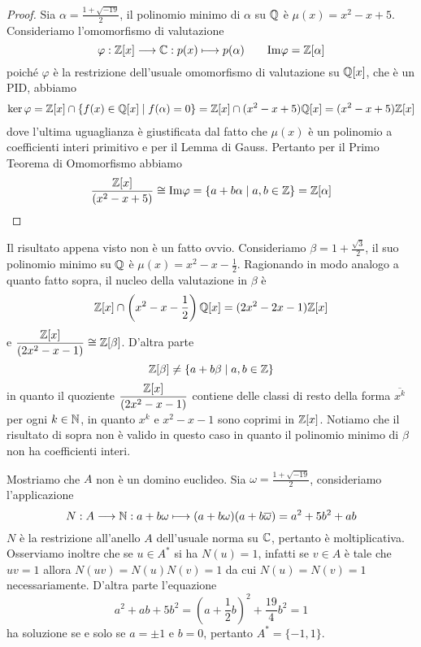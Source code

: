 \documentclass[11pt]{scrartcl}
\begin{document}
\begin{proof}
    Sia $\alpha = \displaystyle\frac{1 + \sqrt{-19}}{2}$, il polinomio minimo di $\alpha$
    su $\mathbb Q$ è $\mu(x) = x^2 - x + 5$. Consideriamo l'omomorfismo di valutazione
    \[
        \varphi: \mathbb Z[x]\longrightarrow \mathbb C: p(x) \longmapsto p(\alpha) 
        \qquad \mathrm{Im\varphi} = \mathbb Z[\alpha]
    \]
    poiché $\varphi$ è la restrizione dell'usuale omomorfismo di valutazione
    su $\mathbb Q[x]$, che è un PID, abbiamo
    \begin{multline*}
        \ker \varphi = \mathbb Z[x] \cap \{f(x) \in \mathbb Q[x]\mid f(\alpha) = 0\}
        = \mathbb Z[x] \cap (x^2 - x + 5)\mathbb Q[x] = (x^2 - x + 5)\mathbb Z[x]
    \end{multline*}
    dove l'ultima uguaglianza è giustificata dal fatto che $\mu(x)$ è un 
    polinomio a coefficienti interi primitivo e per il Lemma di Gauss.
    Pertanto per il Primo Teorema di Omomorfismo abbiamo 
    \[
        \frac{\mathbb Z[x]}{(x^2 - x + 5)} \cong \mathrm{Im\varphi} = 
        \{a + b\alpha \mid a, b \in \mathbb Z\} = \mathbb Z[\alpha]
    \]
\end{proof}

\begin{remark}
    Il risultato appena visto non è un fatto ovvio. Consideriamo $\beta = 
    \displaystyle 1 + \frac{\sqrt{3}}{2}$,
    il suo polinomio minimo su $\mathbb Q$ è $\displaystyle\mu(x) = x^2 - x - \frac 1 2$.
    Ragionando in modo analogo a quanto fatto sopra, il nucleo della valutazione
    in $\beta$ è 
    \[
        \mathbb Z[x] \cap \left(x^2 - x - \frac 1 2\right)\mathbb Q[x] =(2x^2 - 2x - 1)\mathbb Z[x]
    \]
    e $\displaystyle\frac{\mathbb Z[x]}{(2x^2 - x - 1)} \cong \mathbb Z[\beta]$.
    D'altra parte 
    \[
        \mathbb Z[\beta] \neq \{a + b\beta\mid a, b \in \mathbb Z\}
    \]
    in quanto il quoziente $\displaystyle\frac{\mathbb Z[x]}{(2x^2 - x - 1)}$
    contiene delle classi di resto della forma $\overline{x^k}$ per ogni $k \in \mathbb N$,
    in quanto $x^k$ e $x^2 - x - 1$ sono coprimi in $\mathbb Z[x]$. Notiamo che
    il risultato di sopra non è valido in questo caso in quanto il polinomio
    minimo di $\beta$ non ha coefficienti interi.
\end{remark}

Mostriamo che $A$ non è un domino euclideo. Sia $\omega = 
\displaystyle\frac{1 + \sqrt{-19}}{2}$, consideriamo l'applicazione
\[
    N: A \longrightarrow \mathbb N: a + b\omega \longmapsto (a + b\omega)(a + b\overline{\omega}) =
    a^2 + 5b^2 + ab
\]
$N$ è la restrizione all'anello $A$ dell'usuale norma su $\mathbb C$,
pertanto è moltiplicativa. Osserviamo inoltre che se $u \in A^*$ si ha 
$N(u)= 1$, infatti se $v \in A$ è tale che $uv = 1$ allora $N(uv) = N(u)N(v) = 1$
da cui $N(u) = N(v) = 1$ necessariamente. D'altra parte l'equazione 
\[
    a^2 + ab + 5b^2 = \left(a + \frac 1 2 b\right)^2 + \frac{19}{4} b^2 = 1
\]
ha soluzione se e solo se $a = \pm 1$ e $b = 0$, pertanto $A^* = \{-1, 1\}$.
\end{document}
